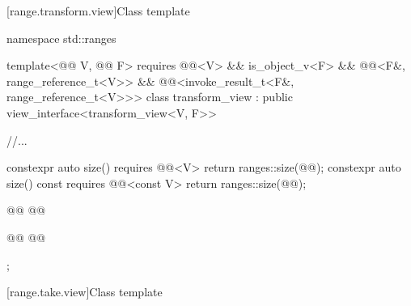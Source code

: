 \documentclass{wg21}
\begin{document}
[range.transform.view]{Class template }

%
%
%
\begin{codeblock}
namespace std::ranges {
template<@@ V, @@ F>
requires @@<V> && is_object_v<F> &&
@@<F&, range_reference_t<V>> &&
@@<invoke_result_t<F&, range_reference_t<V>>>
class transform_view : public view_interface<transform_view<V, F>> {
    //...

    constexpr auto size() requires @@<V> { return ranges::size(@@); }
    constexpr auto size() const requires @@<const V>
    { return ranges::size(@@); }

    @@
    @@

    @@
    @@
};

}
\end{codeblock}

[range.take.view]{Class template }
\end{document}
